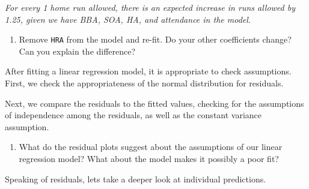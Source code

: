 \documentclass[]{article}
\newenvironment{Shaded}{\begin{snugshade}}{\end{snugshade}}
\newcommand{\DataTypeTok}[1]{\textcolor[rgb]{0.13,0.29,0.53}{#1}}
\newcommand{\FloatTok}[1]{\textcolor[rgb]{0.00,0.00,0.81}{#1}}
\newcommand{\KeywordTok}[1]{\textcolor[rgb]{0.13,0.29,0.53}{\textbf{#1}}}
\newcommand{\NormalTok}[1]{#1}
\newcommand{\OperatorTok}[1]{\textcolor[rgb]{0.81,0.36,0.00}{\textbf{#1}}}
\newcommand{\StringTok}[1]{\textcolor[rgb]{0.31,0.60,0.02}{#1}}
\providecommand{\tightlist}{%
  \setlength{\itemsep}{0pt}\setlength{\parskip}{0pt}}
\begin{document}
\emph{For every 1 home run allowed, there is an expected increase in
runs allowed by 1.25, given we have BBA, SOA, HA, and attendance in the
model.}

\begin{enumerate}
\def\labelenumi{\arabic{enumi}.}
\setcounter{enumi}{3}
\tightlist
\item
  Remove \texttt{HRA} from the model and re-fit. Do your other
  coefficients change? Can you explain the difference?
\end{enumerate}

After fitting a linear regression model, it is appropriate to check
assumptions. First, we check the appropriateness of the normal
distribution for residuals.

\begin{Shaded}
\end{Shaded}

Next, we compare the residuals to the fitted values, checking for the
assumptions of independence among the residuals, as well as the constant
variance assumption.

\begin{Shaded}
\end{Shaded}

\begin{enumerate}
\def\labelenumi{\arabic{enumi}.}
\setcounter{enumi}{4}
\tightlist
\item
  What do the residual plots suggest about the assumptions of our linear
  regression model? What about the model makes it possibly a poor fit?
\end{enumerate}

Speaking of residuals, lets take a deeper look at individual
predictions.
\end{document}
